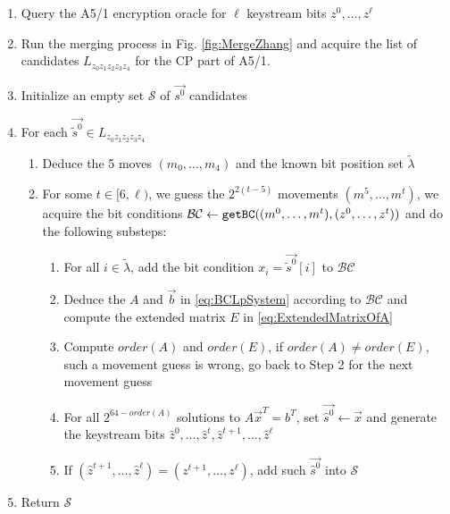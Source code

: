 \begin{enumerate}
  \item Query the A5/1 encryption oracle for $\ell$ keystream bits $z^0,\ldots, z^{\ell}$
  \item Run the merging process in Fig. \ref{fig:MergeZhang} and acquire the list of candidates $L_{z_0z_1z_2z_3z_4}$ for the CP part of A5/1.
   \item Initialize an empty set $\mathcal{S}$ of $\vec{s^0}$ candidates
   \item For each $\vec{\tilde{s}^0}\in L_{z_0z_1z_2z_3z_4}$
   \begin{enumerate}
     \item Deduce the 5 moves $(m_0,\ldots, m_4)$ and the known bit position set $\tilde{\lambda}$
     \item For some $t \in [6,\ell)$, we guess the $2^{2(t-5)}$ movements $(m^5,\ldots, m^t)$, we acquire the bit conditions $\mathcal{BC}\leftarrow {\tt getBC}((m^0,\ldots, m^t), (z^0,\ldots, z^t))$ and do the following substeps:
     \begin{enumerate}
        \item For all $i\in \tilde{\lambda}$, add the bit condition $x_i=\vec{\tilde{s}^0}[i]$ to $\mathcal{BC}$
        \item Deduce the $A$ and $\vec b$ in \eqref{eq:BCLpSystem} according to $\mathcal{BC}$ and compute the extended matrix $E$ in \eqref{eq:ExtendedMatrixOfA}
        \item Compute $order(A)$ and $order(E)$, if $order(A)\neq order(E)$, such a movement guess is wrong, go back to Step 2 for the next movement guess
        \item For all $2^{64-order(A)}$ solutions to $A\vec x^T=b^T$, set $\vec{\hat{s}^0}\leftarrow \vec x$ and generate the keystream bits $\hat{z}^0,\ldots, \hat{z}^t,\hat{z}^{t+1},\ldots, \hat{z}^{\ell}$
        \item If $(\hat{z}^{t+1},\ldots, \hat{z}^{\ell})=(z^{t+1},\ldots, z^{\ell})$, add such $\vec{\hat{s}^0}$ into $\mathcal{S}$
      \end{enumerate}
   \end{enumerate}
  \item Return $\mathcal{S}$
\end{enumerate}

